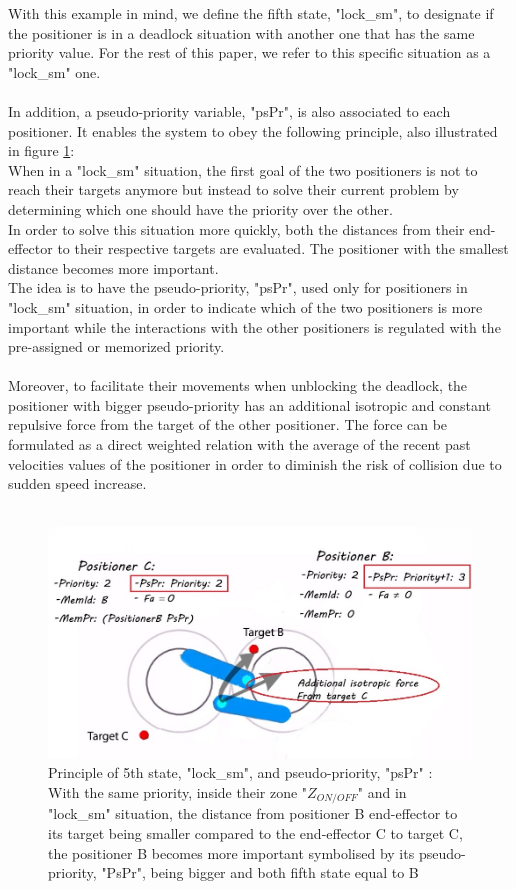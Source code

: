 \documentclass[]{spie}  %
\begin{document}
	
	With this example in mind, we define the fifth state, "lock\_sm", to designate if the positioner is in a deadlock situation with another one that has the same priority value. For the rest of this paper, we refer to this specific situation as a "lock\_sm" one. \\\\
	In addition, a pseudo-priority variable, "psPr", is also associated to each positioner. It enables the system to obey the following principle, also illustrated in figure \ref{5thState}:\\
	When in a "lock\_sm" situation, the first goal of the two positioners is not to reach their targets anymore but instead to solve their current problem by determining which one should have the priority over the other. \\
	 In order to solve this situation more quickly, both the distances from their end-effector to their respective targets are evaluated. The positioner with the smallest distance becomes more important. \\
	 The idea is to have the pseudo-priority, "psPr", used only for positioners in "lock\_sm" situation, in order to indicate which of the two positioners is more important while the interactions with the other positioners is regulated with the pre-assigned or memorized priority. \\\\
	Moreover, to facilitate their movements when unblocking the deadlock, the positioner with bigger pseudo-priority has an additional isotropic and constant repulsive force from the target of the other positioner. The force can be formulated as a direct weighted relation with the average of the recent past velocities values of the positioner in order to diminish the risk of collision due to sudden speed increase.\\\\
	
	\begin{figure}[H]
		\centering
		\includegraphics[scale=0.4]{images/5thstate.jpg}
		\caption{\centering Principle of 5th state, "lock\_sm", and pseudo-priority, "psPr" :\\
		With the same priority, inside their zone "$Z_{ON/OFF}$" and in "lock\_sm" situation, the distance from positioner B end-effector to its target being smaller compared to the end-effector C to target C, the positioner B becomes more important symbolised by its pseudo-priority, "PsPr", being bigger and both fifth state equal to B}
		\label{5thState}
	\end{figure}
	
\end{document}
